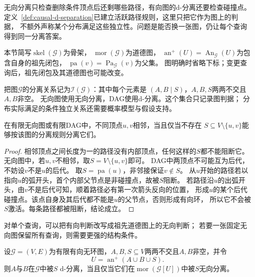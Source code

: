 无向分离只检查删除条件顶点后还剩哪些路径，有向图的d-分离还要检查碰撞点。
定义~\ref{def:causal-d-separation}已建立活跃路径规则，这里只把它作为图上的判据，
不额外声称某个分布满足这些独立性。问题是能否换一张图，仍让每个查询得到同一分离答案。

本节简写$\operatorname{skel}(\mathcal G)$为骨架，
$\operatorname{mor}(\mathcal G)$为道德图，
$\operatorname{an}^{+}(U)=\operatorname{An}_{\mathcal G}(U)$为包含自身的祖先闭包，
$\operatorname{pa}(v)=\operatorname{Pa}_{\mathcal G}(v)$为父集。
图明确时省略下标；变更查询后，祖先闭包及其道德图也可能改变。

把图$\mathcal G$的分离关系记为$\mathcal I(\mathcal G)$：其中每个元素是
$(A,B\mid S)$，$A,B,S$两两不交且$A,B$非空。
无向图使用无向分离，DAG使用d-分离。这个集合只记录图判据；
分布实际满足的条件独立关系还需要概率模型与假设支持。

\begin{lemma}[分离关系中的邻接判据]
\label{lem:graph-theory-separation-adjacency}
在有限无向图或有限DAG中，不同顶点$u,v$相邻，当且仅当不存在
$S\subseteq V\setminus\{u,v\}$能够按该图的分离规则分离它们。
\end{lemma}
\begin{proof}
相邻顶点之间长度为一的路径没有内部顶点，任何这样的$S$都不能阻断它。
无向图中，若$u,v$不相邻，取$S=V\setminus\{u,v\}$即可。
DAG中两顶点不可能互为后代，不妨设$v$不是$u$的后代。
取$S=\operatorname{pa}(u)$，非邻接保证$v\notin S$。
从$u$开始的路径若以指向$u$的弧开头，首个内部父节点是非碰撞点，故被$S$阻断。
若路径沿$u$的出弧开头，由$v$不是后代可知，顺着路径必有第一次箭头反向的位置，
形成$u$的某个后代碰撞点。该点自身及其后代都不能是$u$的父节点，否则形成有向环，
所以它不会被$S$激活。每条路径都被阻断，结论成立。
\end{proof}

对单个查询，可以把有向判断改写成祖先道德图上的无向判断；
若要一张固定无向图保留所有查询，则需要更强的结构条件。
\begin{theorem}[祖先道德化判据]
  \label{thm:graph-theory-ancestral-moralization}
  设$\mathcal{G}=(V,E)$为有限有向无环图，$A,B,S\subseteq V$两两不交且$A,B$非空，并令
  \[
    U=\operatorname{an}^{+}(A\cup B\cup S).
  \]
  则$A$与$B$在$\mathcal{G}$中被$S$ d-分离，当且仅当它们在$\operatorname{mor}(\mathcal{G}[U])$中被$S$无向分离。
\end{theorem}

